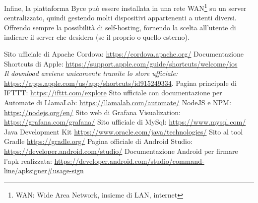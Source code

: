 \documentclass[target=bach]{thud}
\begin{document}
Infine, la piattaforma Byce può essere installata in una rete WAN\footnote[2]{WAN: Wide Area Network, insieme di LAN, internet} su un server centralizzato, quindi gestendo molti dispositivi appartenenti a utenti diversi. Offrendo sempre la possibilità di self-hosting, fornendo la scelta all'utente di indicare il server che desidera (se il proprio o quello esterno).


\appendix




\backmatter




\begin{thebibliography}{9}
    Sito ufficiale di Apache Cordova: \url{https://cordova.apache.org/}
    Documentazione Shortcuts di Apple: \url{https://support.apple.com/guide/shortcuts/welcome/ios}\\
    \textit{Il download avviene unicamente tramite lo store ufficiale:} \url{https://apps.apple.com/us/app/shortcuts/id915249334}.
    Pagina principale di IFTTT: \url{https://ifttt.com/explore}
    Sito ufficiale con documentazione per Automate di LlamaLab: \url{https://llamalab.com/automate/}
    NodeJS e NPM: \url{https://nodejs.org/en/}
    Sito web di Grafana Visualization: \url{https://grafana.com/grafana/}
    Sito ufficiale di MySql: \url{https://www.mysql.com/}
    Java Development Kit \url{https://www.oracle.com/java/technologies/}
    Sito al tool Gradle \url{https://gradle.org/}
    Pagina officiale di Android Studio: \url{https://developer.android.com/studio/}
    Documentazione Android per firmare l'apk realizzata: \url{https://developer.android.com/studio/command-line/apksigner#usage-sign}


\end{thebibliography}


\end{document}
